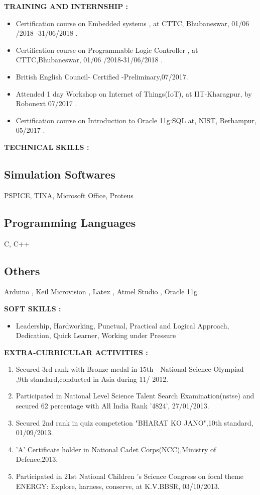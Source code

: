 \documentclass[a4]{article}
\begin{document}
\vspace{3mm}
\textbf{TRAINING AND INTERNSHIP : } 
\begin{itemize}
	\item Certification course on Embedded systems , at CTTC, Bhubaneswar, 01/06
/2018 -31/06/2018 .
	\item Certification course on Programmable Logic Controller , at CTTC,Bhubaneswar, 01/06
/2018-31/06/2018 .
         \item British English Council- Certified -Preliminary,07/2017. 
         \item Attended 1 day Workshop on Internet of Things(IoT), at IIT-Kharagpur, by Robonext 07/2017 .
         \item Certification course on Introduction to Oracle 11g:SQL  at, NIST, Berhampur, 
05/2017 .
\end{itemize}

\vspace{3mm}
\textbf{TECHNICAL SKILLS : } 

\subsection{Simulation Softwares}	
      PSPICE, TINA, Microsoft Office, Proteus
\subsection{Programming Languages}
 C, C++
\subsection{Others}
Arduino , Keil Microvision , Latex , Atmel Studio , Oracle 11g

\vspace{3mm}
\textbf{SOFT SKILLS : } 
\begin{itemize}
	\item Leadership,  Hardworking,  Punctual,  Practical  and Logical Approach, Dedication, Quick Learner, Working 
under Pressure 
	
\end{itemize}


\vspace{3mm}
\textbf{EXTRA-CURRICULAR ACTIVITIES : } 
\begin{enumerate}
	\item Secured 3rd rank with Bronze medal in 15th - National Science Olympiad ,9th standard,conducted in Asia during 11/ 2012.
        \item Participated in National Level Science Talent Search Examination(nstse) and secured 62 percentage with All India Rank '4824', 27/01/2013.
	\item Secured 2nd rank in quiz competetion "BHARAT KO JANO",10th standard, 01/09/2013.
        \item 'A' Certificate holder in National Cadet Corps(NCC),Ministry of Defence,2013.
        \item Participated in 21st National Children 's Science Congress on focal theme ENERGY: Explore, harness, conserve, at K.V.BBSR, 03/10/2013.
        
\end{enumerate}
\end{document}
